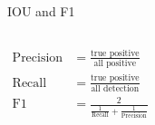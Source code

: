 \begin{frame}{IOU and F1}
\begin{columns}
    \begin{equation*}
      \begin{split}
        \text{Precision} &= \frac{\text{true positive}}{\text{all positive}} \\
        \text{Recall} &= \frac{\text{true positive}}{\text{all detection}} \\
        \text{F1} &= \frac{2}{\frac{1}{\text{Recall}} + \frac{1}{\text{Precision}}}
      \end{split}
    \end{equation*}
  \end{columns}
\end{frame}

